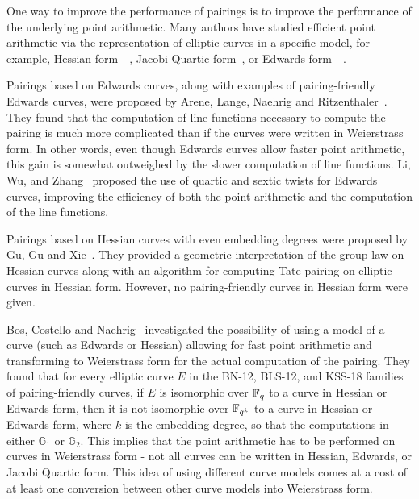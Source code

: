 One way to improve the performance of pairings is
to improve the performance of the underlying point arithmetic.
Many authors have studied efficient point arithmetic via the 
representation of elliptic curves in a specific model,
for example, Hessian form~\cite{2001/smart}~\cite{2001/joye}, Jacobi Quartic form~\cite{}, or
Edwards form~\cite{2007/edwards}~\cite{2007/bernstein-newelliptic}.

Pairings based on Edwards curves,
along with examples of pairing-friendly Edwards curves,
were proposed by Arene, Lange, Naehrig and Ritzenthaler~\cite{2009/fastertate}.
They found that the computation of line functions necessary to compute the pairing
is much more complicated than if the curves were written in Weierstrass form.
In other words,
even though Edwards curves allow faster point arithmetic,
this gain is somewhat outweighed by the slower computation of line functions.
Li, Wu, and Zhang~\cite{2002/LWZ} proposed the use of quartic and sextic twists
for Edwards curves, improving the efficiency of both the point arithmetic and
the computation of the line functions.

Pairings based on Hessian curves with even embedding degrees were proposed by Gu, Gu and Xie~\cite{2010/Gu}.
They provided a geometric interpretation of the group law on Hessian curves
along with an algorithm for computing Tate pairing on elliptic curves in Hessian form.
However, no pairing-friendly curves in Hessian form were given.

Bos, Costello and Naehrig~\cite{2013/bos-pairing} investigated the possibility of
using a model of a curve (such as Edwards or Hessian) allowing for fast point arithmetic
and transforming to Weierstrass form for the actual computation of the pairing.
They found that for every elliptic curve $E$ in the BN-12, BLS-12, and KSS-18 families of pairing-friendly curves,
if $E$ is isomorphic over $\mathbb{F}_{q}$ to a curve in Hessian or Edwards form,
then it is not isomorphic over $\mathbb{F}_{q^{k}}$ to a curve in Hessian or Edwards form,
where $k$ is the embedding degree, so that the computations in either $\mathbb{G}_1$ or $\mathbb{G}_2$.
This implies that the point arithmetic has to be performed on curves in Weierstrass form - not all curves can be written in Hessian, Edwards, or Jacobi Quartic form.
This idea of using different curve models comes at a cost of at least one conversion
between other curve models into Weierstrass form.

